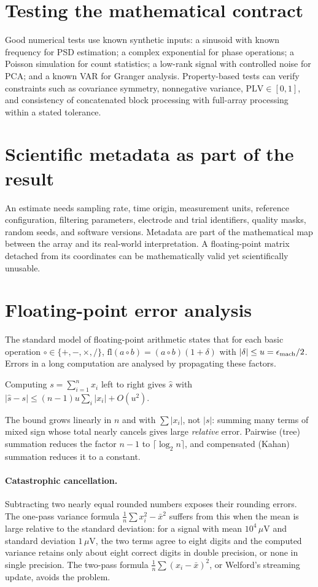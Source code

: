 \section{Testing the mathematical contract}
Good numerical tests use known synthetic inputs: a sinusoid with known frequency for PSD estimation; a complex exponential for phase operations; a Poisson simulation for count statistics; a low-rank signal with controlled noise for PCA; and a known VAR for Granger analysis. Property-based tests can verify constraints such as covariance symmetry, nonnegative variance, $\mathrm{PLV}\in[0,1]$, and consistency of concatenated block processing with full-array processing within a stated tolerance.

\section{Scientific metadata as part of the result}
An estimate needs sampling rate, time origin, measurement units, reference configuration, filtering parameters, electrode and trial identifiers, quality masks, random seeds, and software versions. Metadata are part of the mathematical map between the array and its real-world interpretation. A floating-point matrix detached from its coordinates can be mathematically valid yet scientifically unusable.

\section{Floating-point error analysis}
The standard model of floating-point arithmetic states that for each basic operation $\circ\in\{+,-,\times,/\}$, $\mathrm{fl}(a\circ b)=(a\circ b)(1+\delta)$ with $|\delta|\le u=\epsilon_{\rm mach}/2$. Errors in a long computation are analysed by propagating these factors.

\begin{proposition}
Computing $s=\sum_{i=1}^nx_i$ left to right gives $\hat s$ with $|\hat s-s|\le(n-1)u\sum_i|x_i|+O(u^2)$.
\end{proposition}
The bound grows linearly in $n$ and with $\sum|x_i|$, not $|s|$: summing many terms of mixed sign whose total nearly cancels gives large \emph{relative} error. Pairwise (tree) summation reduces the factor $n-1$ to $\lceil\log_2n\rceil$, and compensated (Kahan) summation reduces it to a constant.

\paragraph{Catastrophic cancellation.} Subtracting two nearly equal rounded numbers exposes their rounding errors. The one-pass variance formula $\frac1n\sum x_i^2-\bar x^2$ suffers from this when the mean is large relative to the standard deviation: for a signal with mean $10^4\,\mu$V and standard deviation $1\,\mu$V, the two terms agree to eight digits and the computed variance retains only about eight correct digits in double precision, or none in single precision. The two-pass formula $\frac1n\sum(x_i-\bar x)^2$, or Welford's streaming update, avoids the problem.

